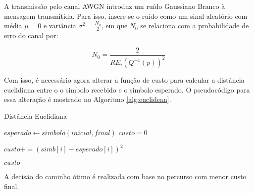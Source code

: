 A transmissão pelo canal AWGN introduz um ruído Gaussiano Branco à mensagem transmitida. Para isso, insere-se o ruído como um sinal aleatório com média $\mu = 0$ e variância $\sigma^{2} = \frac{N_{0}}{2}$, em que $N_{0}$ se relaciona com a probabilidade de erro do canal por:

\begin{equation}
	N_{0} = \frac{2}{R E_{i} (Q^{-1}(p))^{2}}
\end{equation}

Com isso, é necessário agora alterar a função de custo para calcular a distância euclidiana entre o o simbolo recebido e o simbolo esperado. O pseudocódigo para essa alteração é mostrado no Algoritmo \ref{alg:euclidean}.

\begin{algorithm}[h!]
	\caption{Distância Euclidiana}
	\label{alg:euclidean}
	\begin{algorithmic}[Message]		
		\State $esperado \gets simbolo(inicial, final)$
		\State $custo = 0$
		
		\State $custo += (simb[i] - esperado[i])^{2}$
		\EndFor
		
		\Return $custo$
		\EndProcedure
	\end{algorithmic}
\end{algorithm}

A decisão do caminho ótimo é realizada com base no percurso com menor custo final.

